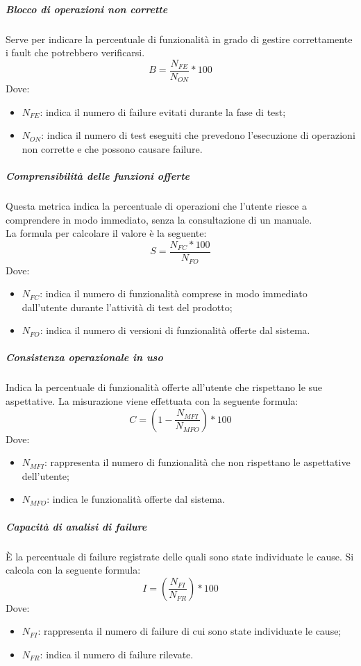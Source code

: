 \documentclass[../NormeDiProgetto_v4.0.0.tex]{subfiles}
\begin{document}
			\subparagraph{Blocco di operazioni non corrette}
				Serve per indicare la percentuale di funzionalità in grado di gestire correttamente i fault che potrebbero verificarsi.
				\begin{equation*}
					B = \frac{N_{FE}}{N_{ON}} * 100
				\end{equation*}
				Dove:
				\begin{itemize}
					\item \textbf{$N_{FE}$}: indica il numero di failure evitati durante la fase di test;
					\item \textbf{$N_{ON}$}: indica il numero di test eseguiti che prevedono l'esecuzione di operazioni non corrette e che possono causare failure.
				\end{itemize}

			\subparagraph{Comprensibilità delle funzioni offerte}
				Questa metrica indica la percentuale di operazioni che l'utente riesce a comprendere in modo immediato, senza la consultazione di un manuale.\\La formula per calcolare il valore è la seguente:
				\begin{equation*}
					S = \frac{N_{FC} * 100}{N_{FO}}
				\end{equation*}
				Dove:
				\begin{itemize}
					\item \textbf{$N_{FC}$}: indica il numero di funzionalità comprese in modo immediato dall'utente durante l'attività di test del prodotto;
					\item \textbf{$N_{FO}$}: indica il numero di versioni di funzionalità offerte dal sistema.
				\end{itemize}
				
	
			\subparagraph{Consistenza operazionale in uso}
				Indica la percentuale di funzionalità offerte all'utente che rispettano le sue aspettative. La misurazione viene effettuata con la seguente formula:
				\begin{equation*}
					C = (1 - \frac{N_{MFI}}{N_{MFO}}) * 100
				\end{equation*}
				Dove:
				\begin{itemize}
					\item \textbf{$N_{MFI}$}:  rappresenta il numero di funzionalità che non rispettano le aspettative dell'utente;
					\item \textbf{$	N_{MFO}$}:  indica le funzionalità offerte dal sistema.
				\end{itemize}
			
			\subparagraph{Capacità di analisi di failure}
				È la percentuale di failure registrate delle quali sono state individuate le cause. Si calcola con la seguente formula:
					\begin{equation*}
						I = (\frac{N_{FI}}{N_{FR}}) * 100
					\end{equation*}
					Dove:
					\begin{itemize}
						\item \textbf{$	N_{FI}$}: rappresenta il numero di failure di cui sono state individuate le cause;
						\item \textbf{$N_{FR}$}: indica il numero di failure rilevate.
					\end{itemize}
\end{document}
